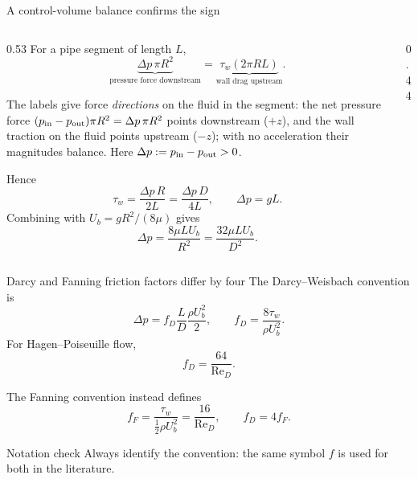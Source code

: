 \documentclass[aspectratio=169,11pt]{beamer}
\newcommand{\Rey}{\mathrm{Re}}
\begin{document}
\begin{frame}{A control-volume balance confirms the sign}
\begin{columns}[T,onlytextwidth]
\begin{column}{0.53\textwidth}
For a pipe segment of length $L$,
\[
  \underbrace{\Delta p\,\pi R^2}_{\text{pressure force downstream}}
  =\underbrace{\tau_w(2\pi RL)}_{\text{wall drag upstream}}.
\]
{\scriptsize The labels give force \emph{directions} on the fluid in the segment: the net pressure force $(p_{\rm in}-p_{\rm out})\pi R^2=\Delta p\,\pi R^2$ points downstream ($+z$), and the wall traction on the fluid points upstream ($-z$); with no acceleration their magnitudes balance. Here $\Delta p:=p_{\rm in}-p_{\rm out}>0$.\par}
Hence
\[
  \tau_w=\frac{\Delta p\,R}{2L}
  =\frac{\Delta p\,D}{4L},
  \qquad \Delta p=gL.
\]
Combining with $U_b=gR^2/(8\mu)$ gives
\[
  \Delta p=\frac{8\mu LU_b}{R^2}
          =\frac{32\mu LU_b}{D^2}.
\]
\end{column}
\begin{column}{0.44\textwidth}
\centering
{}
\end{column}
\end{columns}
\end{frame}

\begin{frame}{Darcy and Fanning friction factors differ by four}
The Darcy--Weisbach convention is
\[
  \Delta p=f_D\frac LD\frac{\rho U_b^2}{2},
  \qquad
  f_D=\frac{8\tau_w}{\rho U_b^2}.
\]
For Hagen--Poiseuille flow,
\[
  \boxed{f_D=\frac{64}{\Rey_D}}.
\]

The Fanning convention instead defines
\[
  f_F=\frac{\tau_w}{\tfrac12\rho U_b^2}
  =\frac{16}{\Rey_D},
  \qquad f_D=4f_F.
\]

\begin{alertblock}{Notation check}
Always identify the convention: the same symbol $f$ is used for both in the literature.
\end{alertblock}
\end{frame}
\end{document}

